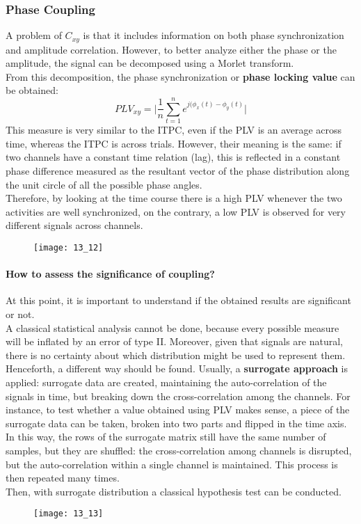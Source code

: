 \subsubsection{Phase Coupling}
A problem of \(C_{xy}\) is that it includes information on both phase synchronization
and amplitude correlation. However, to better analyze either the phase or the
amplitude, the signal can be decomposed using a Morlet transform.\\
From this decomposition, the phase synchronization or \textbf{phase locking value} can
be obtained:
\begin{equation*}
    PLV_{xy}=\biggl|\frac{1}{n}\sum_{t=1}^ne^{j(\phi_x(t)-\phi_y(t)}\biggr|
\end{equation*}
This measure is very similar to the ITPC, even if the PLV is an average across time,
whereas the ITPC is across trials. However, their meaning is the same: if two channels
have a constant time relation (lag), this is reflected in a constant phase difference
measured as the resultant vector of the phase distribution along the unit circle of
all the possible phase angles.\\
Therefore, by looking at the time course there is a high PLV whenever the two
activities are well synchronized, on the contrary, a low PLV is observed for very
different signals across channels.
\begin{figure}[H]
    \centering
    \texttt{[image: 13\_12]}
\end{figure}
\paragraph{How to assess the significance of coupling?}
At this point, it is important to understand if the obtained results are significant
or not.\\
A classical statistical analysis cannot be done, because every possible measure will
be inflated by an error of type II. Moreover, given that signals are natural, there is
no certainty about which distribution might be used to represent them.\\
Henceforth, a different way should be found. Usually, a \textbf{surrogate approach} is
applied: surrogate data are created, maintaining the auto-correlation of the signals in time,
but breaking down the cross-correlation among the channels. For instance, to test
whether a value obtained using PLV makes sense, a piece of the surrogate data can be
taken, broken into two parts and flipped in the time axis. In this way, the rows of
the surrogate matrix still have the same number of samples, but they are shuffled:
the cross-correlation among channels is disrupted, but the auto-correlation within a
single channel is maintained. This process is then repeated many times.\\
Then, with surrogate distribution a classical hypothesis test can be conducted.
\begin{figure}[H]
    \centering
    \texttt{[image: 13\_13]}
\end{figure}
